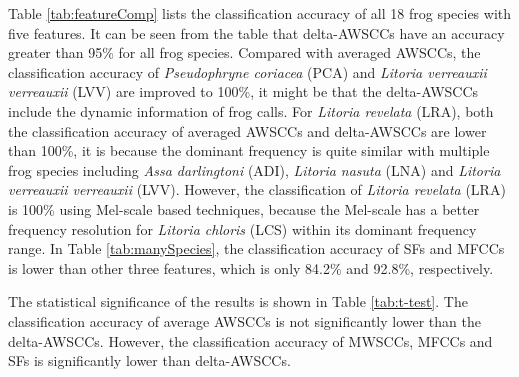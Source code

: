 Table \ref{tab:featureComp} lists the classification accuracy of all 18 frog species with five features. It can be seen from the table that delta-AWSCCs have an accuracy greater than 95\% for all frog species. Compared with averaged AWSCCs, the classification accuracy of \textit{Pseudophryne coriacea} (PCA) and \textit{Litoria verreauxii verreauxii} (LVV) are improved to 100\%, it might be that the delta-AWSCCs include the dynamic information of frog calls. For  \textit{Litoria revelata} (LRA), both the classification accuracy of averaged AWSCCs and delta-AWSCCs are lower than 100\%, it is because the dominant frequency is quite similar with multiple frog species including \textit{Assa darlingtoni} (ADI), \textit{Litoria nasuta} (LNA) and \textit{Litoria verreauxii verreauxii} (LVV). However, the classification of \textit{Litoria revelata} (LRA) is 100\% using Mel-scale based techniques, because the Mel-scale has a better frequency resolution for \textit{Litoria chloris} (LCS) within its dominant frequency range. In Table \ref{tab:manySpecies}, the classification accuracy of SFs and MFCCs is lower than other three features, which is only 84.2\% and 92.8\%, respectively. 


The statistical significance of the results is shown in Table \ref{tab:t-test}. The classification accuracy of average AWSCCs is not significantly lower than the delta-AWSCCs. However, the classification accuracy of MWSCCs, MFCCs and SFs is significantly lower than delta-AWSCCs. 

